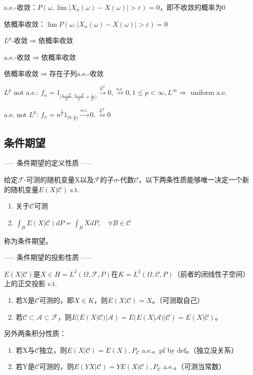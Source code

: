 a.e.-收敛：$P(\omega, \lim |X_n(\omega) - X(\omega)| > \varepsilon) = 0$，即不收敛的概率为0

依概率收敛：$\lim P(\omega, |X_n(\omega) - X(\omega)| > \varepsilon) = 0$

$L^p$-收敛$\Rightarrow$依概率收敛

a.e.-收敛$\Rightarrow$依概率收敛

依概率收敛$\Rightarrow$存在子列a.e.-收敛

$L^p$ not a.e.: $f_n = 1_{[\frac{n - 2^k}{2^k}, \frac{n - 2^k}{2^k} + \frac{1}{2^k})} \overset{L^p}{\to} 0, \overset{a.e.}{\not \to} 0, 1 \le p < \infty, L^\infty \Rightarrow$ uniform a.e.

a.e. not $L^p$: $f_n = n^{\frac{1}{p}} 1_{[0, \frac{1}{n})} \overset{a.e.}{\to} 0, \overset{L^p}{\not \to} 0$

\subsection{条件期望}

----- 条件期望的定义性质 -----

给定$\mathcal{F}$-可测的随机变量X以及$\mathcal{F}$的子$\sigma$-代数$\mathcal{C}$，以下两条性质能够唯一决定一个新的随机变量$E(X|\mathcal{C})$ s.t.

\begin{enumerate}
  \item 关于$\mathcal{C}$可测
  \item $\int_B E(X|\mathcal{C}) dP = \int_B X dP, \quad \forall B \in \mathcal{C}$
\end{enumerate}

称为条件期望。

----- 条件期望的投影性质 -----

$E(X|\mathcal{C})$是$X \in H = L^2(\Omega, \mathcal{F}, P)$在$K = L^2(\Omega, \mathcal{C}, P)$（前者的闭线性子空间）上的正交投影 s.t.

\begin{enumerate}
  \item 若X是$\mathcal{C}$可测的，即$X \in K$，则$E(X|\mathcal{C}) = X$。（可测取自己）
  \item 若$\mathcal{C} \subset \mathcal{A} \subset \mathcal{F}$，则$E(E(X|\mathcal{C})|\mathcal{A}) = E(E(X|\mathcal{A})|\mathcal{C}) = E(X|\mathcal{C})$。
\end{enumerate}

另外两条积分性质：

\begin{enumerate}
  \item 若X与$\mathcal{C}$独立，则$E(X|\mathcal{C}) = E(X), P_{\mathcal{C}}$ a.e.。pf by def。（独立没关系）
  \item 若Y是$\mathcal{C}$可测的，则$E(YX|\mathcal{C}) = Y E(X|\mathcal{C}), P_{\mathcal{C}}$ a.e.。（可测当常数）
\end{enumerate}

